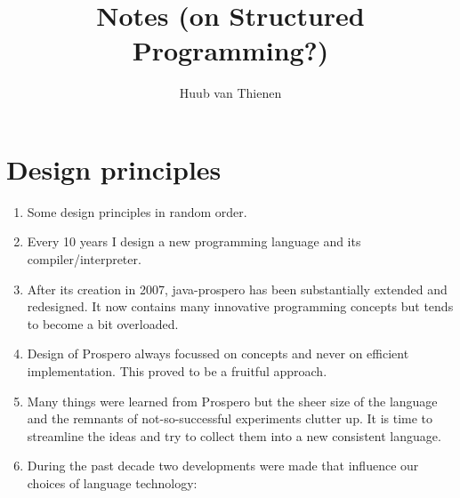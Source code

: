 \documentclass[11pt, a4paper]{article}
\begin{document}
\title{Notes (on Structured Programming?)}
\author{Huub van Thienen}
\maketitle

\section{Design principles}

\begin{enumerate}
\item Some design principles in random order.

\item Every 10 years I design a new programming language and its compiler/interpreter.


\item After its creation in 2007, java-prospero has been substantially extended and 
redesigned. It now contains many innovative programming concepts but tends to become 
a bit overloaded.

\item Design of Prospero always focussed on concepts and never on efficient implementation.
This proved to be a fruitful approach.

\item Many things were learned from Prospero but the sheer size of the language and 
the remnants of not-so-successful experiments clutter up. It is time to streamline the 
ideas and try to collect them into a new consistent language.

\item During the past decade two developments were made that influence our choices of 
language technology:



\end{enumerate}
\end{document}
